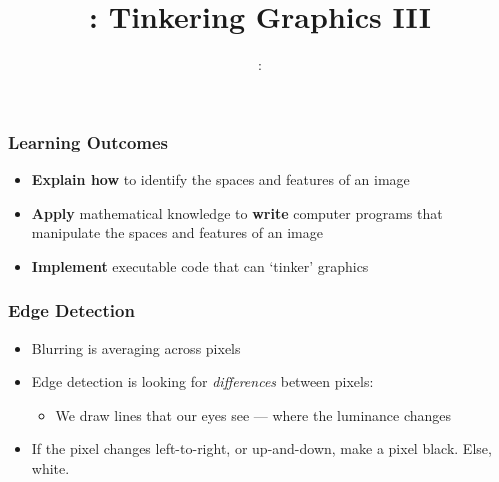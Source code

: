 \usepackage{../../../beamerthemeFalmouthGamesAcademy}
\usepackage{multimedia}
\graphicspath{ {../../../} }


\usepackage[normalem]{ulem}
\usepackage{wasysym}

\usepackage{pdfpages}

\usetikzlibrary{arrows,automata}







\title{\sessionnumber: Tinkering Graphics III}
\subtitle{\modulecode: \moduletitle}

\frame{\titlepage} 

\begin{frame}
	\frametitle{Learning Outcomes}
	\begin{itemize}
		\item \textbf{Explain how} to identify the spaces and features of an image
		\item \textbf{Apply} mathematical knowledge to \textbf{write} computer programs that manipulate the spaces and features of an image
		\item \textbf{Implement} executable code that can `tinker' graphics
	\end{itemize}
\end{frame}

\begin{frame}
	\frametitle{Edge Detection}
	
	\begin{itemize}		
		\item Blurring is averaging across pixels
		\item Edge detection is looking for \textit{differences} between pixels:
		\begin{itemize}
			\item We draw lines that our eyes see --- where the luminance changes
		\end{itemize}	
		\item If the pixel changes left-to-right, or up-and-down, make a pixel black. Else, white.
	\end{itemize}
\end{frame}

